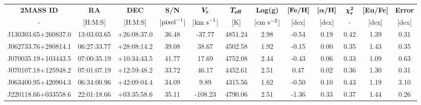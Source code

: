 \documentclass[a4paper,fleqn,usenatbib]{mnras}
\begin{document}
	\begin{table}
		\centering
		\label{Data for the 47}
		\begin{tabular}{@{}cccccccccccc@{}}
			\toprule
			\textbf{2MASS ID}   & \textbf{RA} & \textbf{DEC} & \textbf{S/N}        	& \textbf{$\boldsymbol{V_{\rm{r}}}$}   & \textbf{$\boldsymbol{T_{\rm{eff}}}$} & \textbf{Log(g)}	& \textbf{$\boldsymbol{[\rm{Fe/H}]}$} & \textbf{$\boldsymbol{[\alpha/\rm{H}]}$} & \textbf{$\boldsymbol{\chi_{\rm{r}}^{2}}$} & \textbf{{[}Eu/Fe{]}} & \textbf{Error} \\
			-               	& {[}H:M:S{]}   & {[}H:M:S{]}	& {[}$\rm{pixel}^{-1}${]} & {[}$\rm{km\ s}^{-1}${]} & {[}K{]}             	& {[}$\rm{cm\ s}^{-2}${]} & {[}dex{]}          	& {[}dex{]}              	& -                        	& {[}dex{]}        	& {[}dex{]}  	\\ \midrule
			J130303.65+260837.0 & 13:03:03.65 & +26:08:37.0  & 36.48               	& -37.77              	& 4851.24             	& 2.98           	& -0.54              	& 0.19                   	& 0.42                     	& 1.39             	& 0.31       	\\
			J062733.76+280814.1 & 06:27:33.77 & +28:08:14.2  & 39.08               	& 38.67               	& 4502.58             	& 1.92           	& -0.15              	& 0.00                   	& 0.35                     	& 1.43             	& 0.35       	\\
			J070035.19+103443.5 & 07:00:35.19 & +10:34:43.5  & 41.77               	& 17.69               	& 4752.08             	& 2.44           	& -0.43              	& 0.06                   	& 0.33                     	& 1.09             	& 0.63       	\\
			J070107.18+125948.2 & 07:01:07.19 & +12:59:48.2  & 33.72               	& 46.17               	& 4452.61             	& 2.51           	& 0.47               	& 0.02                   	& 0.36                     	& 1.30             	& 0.31       	\\
			J063400.95+420904.3 & 06:34:00.96 & +42:09:04.4  & 34.09               	& 9.89                	& 4315.56             	& 1.62           	& -0.50              	& 0.10                   	& 0.43                     	& 1.19             	& 3.10       	\\
			J220118.66+033558.6 & 22:01:18.66 & +03:35:58.6  & 35.11               	& -108.23             	& 4790.06             	& 2.51           	& -1.36              	& 0.33                   	& 0.37                     	& 1.44             	& 0.26       	\\

\end{tabular}
\end{table}
\end{document}
